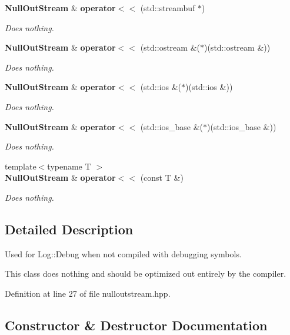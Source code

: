 \begin{DoxyCompactItemize}
\textbf{ Null\+Out\+Stream} \& \textbf{ operator$<$$<$} (std\+::streambuf $\ast$)
\begin{DoxyCompactList}\small\item\em Does nothing. \end{DoxyCompactList}\item 
\textbf{ Null\+Out\+Stream} \& \textbf{ operator$<$$<$} (std\+::ostream \&($\ast$)(std\+::ostream \&))
\begin{DoxyCompactList}\small\item\em Does nothing. \end{DoxyCompactList}\item 
\textbf{ Null\+Out\+Stream} \& \textbf{ operator$<$$<$} (std\+::ios \&($\ast$)(std\+::ios \&))
\begin{DoxyCompactList}\small\item\em Does nothing. \end{DoxyCompactList}\item 
\textbf{ Null\+Out\+Stream} \& \textbf{ operator$<$$<$} (std\+::ios\+\_\+base \&($\ast$)(std\+::ios\+\_\+base \&))
\begin{DoxyCompactList}\small\item\em Does nothing. \end{DoxyCompactList}\item 
{\footnotesize template$<$typename T $>$ }\\\textbf{ Null\+Out\+Stream} \& \textbf{ operator$<$$<$} (const T \&)
\begin{DoxyCompactList}\small\item\em Does nothing. \end{DoxyCompactList}\end{DoxyCompactItemize}


\subsection{Detailed Description}
Used for Log\+::\+Debug when not compiled with debugging symbols. 

This class does nothing and should be optimized out entirely by the compiler. 

Definition at line 27 of file nulloutstream.\+hpp.



\subsection{Constructor \& Destructor Documentation}
\mbox{\label{classmlpack_1_1util_1_1NullOutStream_a198ca0f91124f6e611d20acfdfb40d6f}} 
